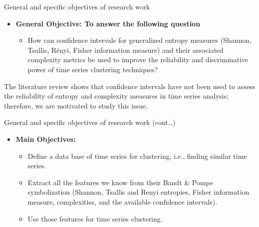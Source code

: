 \documentclass{beamer}
\begin{document}

\begin{frame}{General and specific objectives of research work}
	\begin{itemize}
		\item \textbf{General Objective: To answer the following question}
		\begin{itemize}
			\item How can confidence intervals for generalized entropy measures (Shannon, Tsallis, Rényi, Fisher information measure) and their associated complexity metrics be used to improve the 
			reliability and discriminative power of time series clustering techniques?
			
			
			
		\end{itemize}
	\end{itemize}		
		
The literature review shows that confidence intervals have not been used to assess the reliability of entropy and complexity measures in time series analysis; therefore, we are motivated to study this issue.
\end{frame}

\begin{frame}{General and specific objectives of research work (cont\dots)}
\begin{itemize}
	\item \textbf{Main Objectives:}
	\begin{itemize}
		\item Define a data base of time series for clustering, i.e., finding similar time series. 
		\item Extract all the features we know from their Bandt \& Pompe symbolization (Shannon, Tsallis and Renyi entropies, Fisher information measure, complexities, and the available confidence intervals).
		\item Use those features for time series clustering.
	\end{itemize} 
\end{itemize}	

\end{frame}
\end{document}
